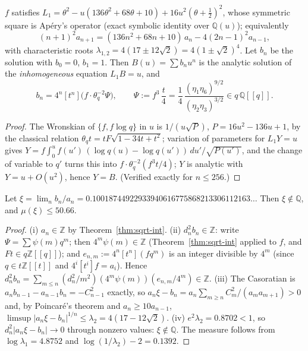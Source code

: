 \begin{proposition}\label{prop:sqrt-rec}
\Proved{} $f$ satisfies $L_1=\theta^2-u(136\theta^2+68\theta+10)+16u^2(\theta+\tfrac12)^2$, whose symmetric square is Ap\'ery's operator \textup{(}exact symbolic identity over $\mathbb Q(u)$\textup{)}; equivalently
\[
(n+1)^2a_{n+1}=(136n^2+68n+10)\,a_n-4(2n-1)^2a_{n-1},
\]
with characteristic roots $\lambda_{1,2}=4(17\pm12\sqrt2)=4(1\pm\sqrt2)^4$. Let $b_n$ be the solution with $b_0=0$, $b_1=1$. Then $B(u)=\sum b_nu^n$ is the analytic solution of the \emph{inhomogeneous} equation $L_1B=u$, and
\[
b_n=4^n[t^n]\bigl(f\cdot\theta_q^{-2}\Psi\bigr),\qquad \Psi:=f^3\,\frac t4=\frac14\,\frac{(\eta_1\eta_6)^{9/2}}{(\eta_2\eta_3)^{3/2}}\in q\,\mathbb Q[[q]] .
\]
\end{proposition}
\begin{proof}
The Wronskian of $\{f,f\log q\}$ in $u$ is $1/(u\sqrt{P})$, $P=16u^2-136u+1$, by the classical relation $\theta_qt=tF\sqrt{1-34t+t^2}$; variation of parameters for $L_1Y=u$ gives $Y=f\int_0^uf(u')\,(\log q(u)-\log q(u'))\,du'/\sqrt{P(u')}$, and the change of variable to $q'$ turns this into $f\cdot\theta_q^{-2}(f^3t/4)$; $Y$ is analytic with $Y=u+O(u^2)$, hence $Y=B$. (Verified exactly for $n\le256$.)
\end{proof}

\begin{theorem}\label{thm:sqrt-irr}
\Proved{} Let $\xi=\lim_nb_n/a_n=0.10018744922933940616775868213306112163\ldots$ Then $\xi\notin\mathbb Q$, and $\mu(\xi)\le50.66$.
\end{theorem}
\begin{proof}
(i) $a_n\in\mathbb Z$ by Theorem~\ref{thm:sqrt-int}. (ii) $d_n^2b_n\in\mathbb Z$: write $\Psi=\sum\psi(m)q^m$; then $4^m\psi(m)\in\mathbb Z$ (Theorem~\ref{thm:sqrt-int} applied to $f$, and $Ft\in q\mathbb Z[[q]]$); and $e_{n,m}:=4^n[t^n](fq^m)$ is an integer divisible by $4^m$ (since $q\in t\mathbb Z[[t]]$ and $4^i[t^i]f=a_i$). Hence $d_n^2b_n=\sum_{m\le n}(d_n^2/m^2)(4^m\psi(m))(e_{n,m}/4^m)\in\mathbb Z$. (iii) The Casoratian is $a_nb_{n-1}-a_{n-1}b_n=-C_{n-1}^2$ exactly, so $a_n\xi-b_n=a_n\sum_{m\ge n}C_m^2/(a_ma_{m+1})>0$ and, by Poincar\'e's theorem and $a_n\ge10a_{n-1}$, $\limsup|a_n\xi-b_n|^{1/n}\le\lambda_2=4(17-12\sqrt2)$. (iv) $e^2\lambda_2=0.8702<1$, so $d_n^2|a_n\xi-b_n|\to0$ through nonzero values: $\xi\notin\mathbb Q$. The measure follows from $\log\lambda_1=4.8752$ and $\log(1/\lambda_2)-2=0.1392$.
\end{proof}

